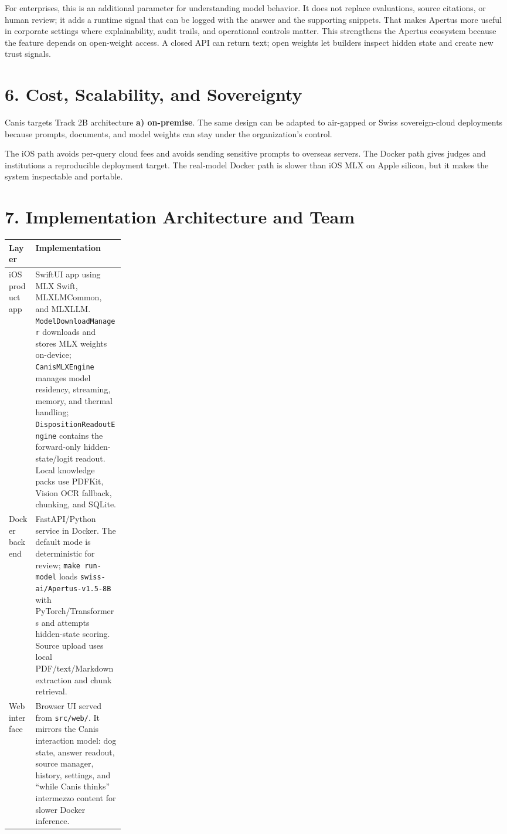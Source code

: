 \documentclass[10pt,a4paper]{article}
\newcommand{\sectionrule}{\vspace{-2pt}{\color{canisLine}\hrule}\vspace{4pt}}
\begin{document}
For enterprises, this is an additional parameter for understanding model behavior. It does not replace evaluations, source citations, or human review; it adds a runtime signal that can be logged with the answer and the supporting snippets. That makes Apertus more useful in corporate settings where explainability, audit trails, and operational controls matter. This strengthens the Apertus ecosystem because the feature depends on open-weight access. A closed API can return text; open weights let builders inspect hidden state and create new trust signals.

\section*{6. Cost, Scalability, and Sovereignty}
\sectionrule
Canis targets Track 2B architecture \textbf{a) on-premise}. The same design can be adapted to air-gapped or Swiss sovereign-cloud deployments because prompts, documents, and model weights can stay under the organization's control.

The iOS path avoids per-query cloud fees and avoids sending sensitive prompts to overseas servers. The Docker path gives judges and institutions a reproducible deployment target. The real-model Docker path is slower than iOS MLX on Apple silicon, but it makes the system inspectable and portable.

\section*{7. Implementation Architecture and Team}
\sectionrule
\begin{tabularx}{\linewidth}{@{}p{0.23\linewidth}X@{}}
\toprule
\textbf{Layer} & \textbf{Implementation} \\
\midrule
iOS product app & SwiftUI app using MLX Swift, MLXLMCommon, and MLXLLM. \texttt{ModelDownloadManager} downloads and stores MLX weights on-device; \texttt{CanisMLXEngine} manages model residency, streaming, memory, and thermal handling; \texttt{DispositionReadoutEngine} contains the forward-only hidden-state/logit readout. Local knowledge packs use PDFKit, Vision OCR fallback, chunking, and SQLite. \\
Docker backend & FastAPI/Python service in Docker. The default mode is deterministic for review; \texttt{make run-model} loads \texttt{swiss-ai/Apertus-v1.5-8B} with PyTorch/Transformers and attempts hidden-state scoring. Source upload uses local PDF/text/Markdown extraction and chunk retrieval. \\
Web interface & Browser UI served from \texttt{src/web/}. It mirrors the Canis interaction model: dog state, answer readout, source manager, history, settings, and ``while Canis thinks'' intermezzo content for slower Docker inference. \\
\bottomrule
\end{tabularx}
\end{document}
